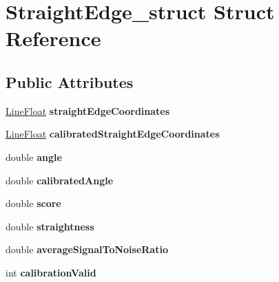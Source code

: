 \hypertarget{structStraightEdge__struct}{
\section{StraightEdge\_\-struct Struct Reference}
\label{structStraightEdge__struct}
}
\subsection*{Public Attributes}
\begin{DoxyCompactItemize}
\item 
\hypertarget{structStraightEdge__struct_a4dc05233cf74e8dc295984104f19ad97}{
\hyperlink{structLineFloat__struct}{LineFloat} {\bfseries straightEdgeCoordinates}}
\label{structStraightEdge__struct_a4dc05233cf74e8dc295984104f19ad97}

\item 
\hypertarget{structStraightEdge__struct_a60df12e99ded8eb4c5aa47d276b2fe7c}{
\hyperlink{structLineFloat__struct}{LineFloat} {\bfseries calibratedStraightEdgeCoordinates}}
\label{structStraightEdge__struct_a60df12e99ded8eb4c5aa47d276b2fe7c}

\item 
\hypertarget{structStraightEdge__struct_a09fd612aaa5113e11d0619226ed4cfa6}{
double {\bfseries angle}}
\label{structStraightEdge__struct_a09fd612aaa5113e11d0619226ed4cfa6}

\item 
\hypertarget{structStraightEdge__struct_ac15d9ea212a7cf287e54ef37b349c057}{
double {\bfseries calibratedAngle}}
\label{structStraightEdge__struct_ac15d9ea212a7cf287e54ef37b349c057}

\item 
\hypertarget{structStraightEdge__struct_ad36a2846715e8dab2e78e2bcb1001699}{
double {\bfseries score}}
\label{structStraightEdge__struct_ad36a2846715e8dab2e78e2bcb1001699}

\item 
\hypertarget{structStraightEdge__struct_af0d949240e263b6239efaf21c243648e}{
double {\bfseries straightness}}
\label{structStraightEdge__struct_af0d949240e263b6239efaf21c243648e}

\item 
\hypertarget{structStraightEdge__struct_a2d5559181843e79b9e82a598114f8e4d}{
double {\bfseries averageSignalToNoiseRatio}}
\label{structStraightEdge__struct_a2d5559181843e79b9e82a598114f8e4d}

\item 
\hypertarget{structStraightEdge__struct_a7531b81c0b37929cf8b9e0f99c3a28bc}{
int {\bfseries calibrationValid}}
\label{structStraightEdge__struct_a7531b81c0b37929cf8b9e0f99c3a28bc}


\end{DoxyCompactItemize}
